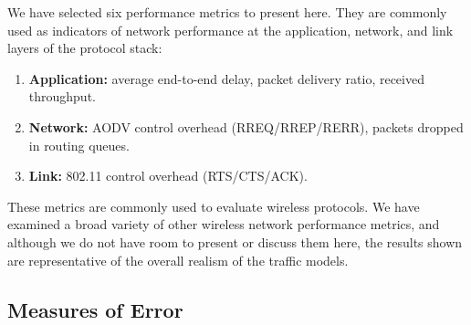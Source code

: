 \documentclass[twocolumn,final]{svjour3}
\newcommand{\caps}[1]{{\small{#1}}}
\begin{document}
We have selected six performance metrics to present here. They are commonly used as indicators of network performance at the application, network, and link layers of the protocol stack:
\begin{enumerate}
\setlength{\itemsep}{0em}
\item \textbf{Application:} average end-to-end delay, packet delivery ratio, received throughput.
\item \textbf{Network:} \caps{AODV} control overhead (\caps{RREQ/RREP/RERR}), packets dropped in routing queues.
\item \textbf{Link:} 802.11 control overhead (\caps{RTS/CTS/ACK}).
\end{enumerate}
These metrics are commonly used to evaluate wireless protocols. We have examined a broad variety of other wireless network performance metrics, and although we do not have room to present or discuss them here, the results shown are representative of the overall realism of the traffic models.

\subsection{Measures of Error}
\label{sec:measures-of-error}
\end{document}
